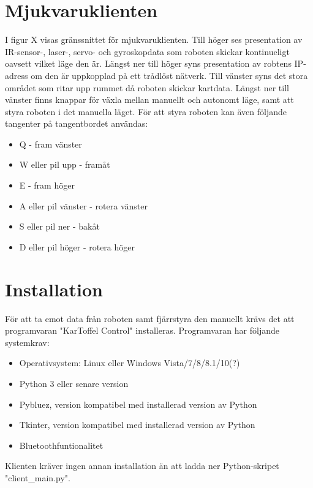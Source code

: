 \documentclass{article}
\begin{document}
\section{Mjukvaruklienten}
I figur X visas gränssnittet för mjukvaruklienten. Till höger ses presentation av IR-sensor-, laser-, servo- och gyroskopdata som roboten skickar kontinueligt oavsett vilket läge den är. Längst ner till höger syns presentation av robtens IP-adress om den är uppkopplad på ett trådlöst nätverk. 
Till vänster syns det stora området som ritar upp rummet då roboten skickar kartdata. Längst ner till vänster finns knappar för växla mellan manuellt och autonomt läge, samt att styra roboten i det manuella läget. För att styra roboten kan även följande tangenter på tangentbordet användas:
\begin{itemize}
    \item Q - fram vänster
    \item W eller pil upp - framåt
    \item E - fram höger
    \item A eller pil vänster - rotera vänster
    \item S eller pil ner - bakåt
    \item D eller pil höger - rotera höger
\end{itemize}

\section{Installation}
För att ta emot data från roboten samt fjärrstyra den manuellt krävs det att programvaran "KarToffel Control" installeras. Programvaran har följande systemkrav:
\begin{itemize}
    \item Operativsystem: Linux eller Windows Vista/7/8/8.1/10(?)
    \item Python 3 eller senare version
    \item Pybluez, version kompatibel med installerad version av Python
    \item Tkinter, version kompatibel med installerad version av Python
    \item Bluetoothfuntionalitet
\end{itemize}

Klienten kräver ingen annan installation än att ladda ner Python-skripet "client_main.py".
\end{document}
